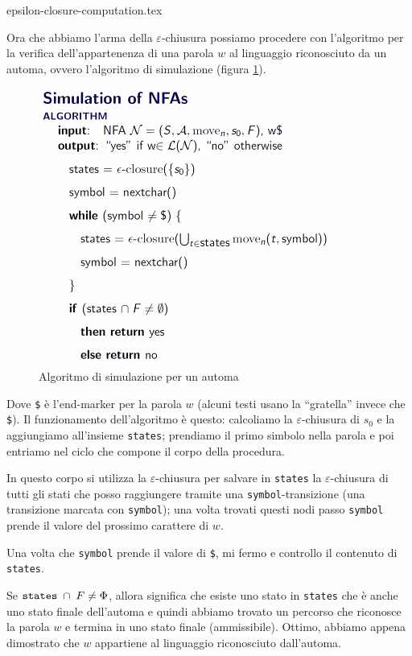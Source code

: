 \documentclass[class=book, crop=false, oneside, 12pt]{standalone}
\begin{document}
	{epsilon-closure-computation.tex}

Ora che abbiamo l'arma della \(\varepsilon\)-chiusura possiamo procedere con l'algoritmo per la verifica dell'appartenenza di una parola \(w\) al linguaggio riconosciuto da un automa, ovvero l'algoritmo di simulazione (figura \ref{algoritmo_simulazione_nfa}).

\begin{figure}
    \centering
    \includegraphics[width=.6\textwidth,keepaspectratio]{algoritmo_simulazione_nfa}
    \caption{Algoritmo di simulazione per un automa}
    \label{algoritmo_simulazione_nfa}
\end{figure}

Dove \texttt{\$} è l’end-marker per la parola \(w\) (alcuni testi usano la “gratella” invece che \texttt{\$}).
Il funzionamento dell'algoritmo è questo: calcoliamo la \(\varepsilon\)-chiusura di \(s_0\) e la aggiungiamo all'insieme \texttt{states}; prendiamo il primo simbolo nella parola e poi entriamo nel ciclo che compone il corpo della procedura.

In questo corpo si utilizza la \(\varepsilon\)-chiusura per salvare in \texttt{states} la \(\varepsilon\)-chiusura di tutti gli stati che posso raggiungere tramite una \texttt{symbol}-transizione (una transizione marcata con \texttt{symbol}); una volta trovati questi nodi passo \texttt{symbol} prende il valore del prossimo carattere di \(w\).

Una volta che \texttt{symbol} prende il valore di \texttt{\$}, mi fermo e controllo il contenuto di \texttt{states}.

Se \(\textrm{\texttt{states}} \; \cap \; F \neq \Phi\), allora significa che esiste uno stato in \texttt{states} che è anche uno stato finale dell'automa e quindi abbiamo trovato un percorso che riconosce la parola \(w\) e termina in uno stato finale (ammissibile). Ottimo, abbiamo appena dimostrato che \(w\) appartiene al linguaggio riconosciuto dall'automa.
\end{document}
